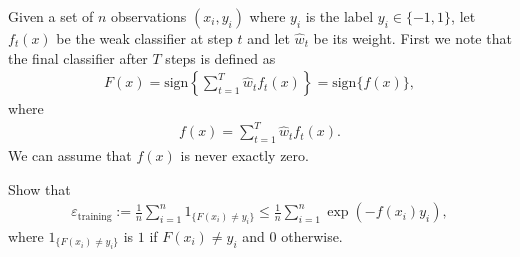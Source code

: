 \item {} Given a set of $n$ observations $(x_i, y_i)$ where $y_i$ is the label $y_i \in \{-1,1\}$, let $f_t(x)$ be the weak classifier at step $t$ and let $\hat{w}_t$ be its weight. First we note that the final classifier after $T$ steps is defined as
		\begin{align*}
			F(x) = \text{sign} \left\{\sum_{t=1}^T \hat{w}_t f_t(x) \right\}
			= \text{sign}\{f(x)\},
		\end{align*}
	where
	\begin{align*}
		f(x) = \sum_{t=1}^T \hat{w}_t f_t(x).
	\end{align*}
	We can assume that $f(x)$ is never exactly zero.

	Show that
	\begin{align*}
		\varepsilon_{\text{training}}
		:= \frac{1}{n} \sum_{i=1}^n 1_{\{F(x_i) \neq y_i\}}
		\le \frac{1}{n} \sum_{i=1}^n \exp(-f(x_i) y_i),
	\end{align*}
	where $1_{\{F(x_i) \neq y_i\}}$ is $1$ if $F(x_i) \neq y_i$ and $0$ otherwise.